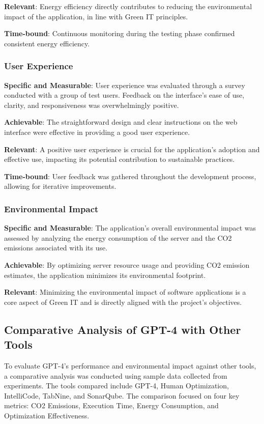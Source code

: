 \documentclass[conference,compsoc]{IEEEtran}
\begin{document}
\textbf{Relevant}: Energy efficiency directly contributes to reducing the environmental impact of the application, in line with Green IT principles.

\textbf{Time-bound}: Continuous monitoring during the testing phase confirmed consistent energy efficiency.

\subsubsection{User Experience}
\textbf{Specific and Measurable}: User experience was evaluated through a survey conducted with a group of test users. Feedback on the interface's ease of use, clarity, and responsiveness was overwhelmingly positive.

\textbf{Achievable}: The straightforward design and clear instructions on the web interface were effective in providing a good user experience.

\textbf{Relevant}: A positive user experience is crucial for the application's adoption and effective use, impacting its potential contribution to sustainable practices.

\textbf{Time-bound}: User feedback was gathered throughout the development process, allowing for iterative improvements.

\subsubsection{Environmental Impact}
\textbf{Specific and Measurable}: The application's overall environmental impact was assessed by analyzing the energy consumption of the server and the CO2 emissions associated with its use.

\textbf{Achievable}: By optimizing server resource usage and providing CO2 emission estimates, the application minimizes its environmental footprint.

\textbf{Relevant}: Minimizing the environmental impact of software applications is a core aspect of Green IT and is directly aligned with the project's objectives.

\subsection{Comparative Analysis of GPT-4 with Other Tools}
To evaluate GPT-4's performance and environmental impact against other tools, a comparative analysis was conducted using sample data collected from experiments. The tools compared include GPT-4, Human Optimization, IntelliCode, TabNine, and SonarQube. The comparison focused on four key metrics: CO2 Emissions, Execution Time, Energy Consumption, and Optimization Effectiveness.
\end{document}
